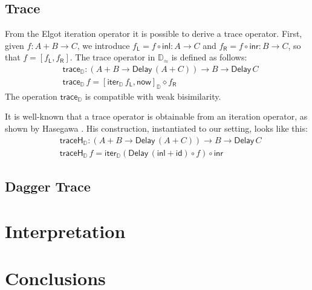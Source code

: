 \documentclass[runningheads]{llncs}
\newcommand{\comp}{\circ}
\newcommand{\inl}{\mathsf{inl}}
\newcommand{\inr}{\mathsf{inr}}
\newcommand{\mapL}[1]{#1_{\mathsf{L}}}
\newcommand{\mapR}[1]{#1_{\mathsf{R}}}
\newcommand{\id}{\mathsf{id}}
\newcommand{\Delay}{\mathsf{Delay}\,}
\newcommand{\now}{\mathsf{now}}
\newcommand{\D}{\mathbb{D}}
\newcommand{\Dapprox}{\mathbb{D}_{\approx}}
\newcommand{\copairD}[2]{[#1,#2]_{\D}}
\newcommand{\iterD}{\mathsf{iter}_\D}
\newcommand{\traceD}{\mathsf{trace}_\D}
\newcommand{\traceHD}{\mathsf{traceH}_\D}
\begin{document}
\subsection{Trace}\label{sec:trace}

From the Elgot iteration operator it is possible to derive a trace
operator. First, given $f : A + B \to C$, we introduce
$\mapL f = f \comp \inl : A \to C$ and
$\mapR f = f \comp \inr : B \to C$, so that $f = [\mapL f , \mapR f]$.
The trace operator in $\Dapprox$ is defined as follows:
\begin{align*}
& \traceD : (A + B \to \Delay (A + C)) \to B \to \Delay C \\
& \traceD \,f = \copairD{\iterD \,\mapL f}{\now} \diamond \mapR f
\end{align*}
The operation $\traceD$ is compatible with weak bisimilarity. 


It is well-known that a trace operator is obtainable from an iteration
operator, as shown by Hasegawa  \cite{Hasegawa97}. His construction,
instantiated to our setting, looks like this:
\begin{align*}
& \traceHD : (A + B \to \Delay (A + C)) \to B \to \Delay C \\
& \traceHD \,f = \iterD (\Delay (\inl + \id) \comp f) \comp \inr
\end{align*}



\subsection{Dagger Trace}\label{sec:daggertrace}


\section{Interpretation}\label{sec:interpretation}

\section{Conclusions}


%
%
%
%
%
%


\end{document}
